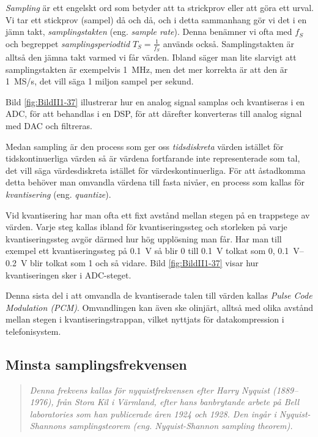\emph{Sampling} är ett engelskt ord som betyder att ta strickprov eller att göra ett urval.
Vi tar ett stickprov (sampel) då och då, och i detta sammanhang gör vi det i en jämn takt,
\emph{samplingstakten} (eng. \emph{sample rate}).
Denna benämner vi ofta med \(f_S\) och begreppet \emph{samplingsperiodtid}
\(T_S=\frac{1}{f_S}\) används också.
Samplingstakten är alltså den jämna takt varmed vi får värden.
Ibland säger man lite slarvigt att samplingstakten är exempelvis 1~MHz, men det
mer korrekta är att den är 1~MS/s, det vill säga 1 miljon sampel per sekund.

Bild \ref{fig:BildII1-37} illustrerar hur en analog signal samplas och
kvantiseras i en ADC, för att behandlas i en DSP, för att därefter konverteras
till analog signal med DAC och filtreras.


Medan sampling är den process som ger oss \emph{tidsdiskreta} värden istället
för tidskontinuerliga värden så är värdena fortfarande inte representerade som
tal, det vill säga värdesdiskreta istället för värdeskontinuerliga.
För att åstadkomma detta behöver man omvandla värdena till fasta nivåer, en
process som kallas för \emph{kvantisering} (eng. \emph{quantize}).

Vid kvantisering har man ofta ett fixt avstånd mellan stegen på en
trappstege av värden. Varje steg kallas ibland för kvantiseringssteg och
storleken på varje kvantiseringssteg avgör därmed hur hög upplösning man får.
Har man till exempel ett kvantiseringssteg på \SI{0,1}{\volt} så blir 0 till
\SI{0,1}{\volt} tolkat som 0, \SIrange{0,1}{0,2}{\volt} blir tolkat som 1 och så
vidare.
Bild \ref{fig:BildII1-37} visar hur kvantiseringen sker i ADC-steget.

Denna sista del i att omvandla de kvantiserade talen till värden kallas
\emph{Pulse Code Modulation (PCM)}.
Omvandlingen kan även ske olinjärt, alltså med olika avstånd mellan stegen i
kvantiseringstrappan, vilket nyttjats för datakompression i telefonisystem.

\subsection{Minsta samplingsfrekvensen}

\begin{quote}
\emph{Denna frekvens kallas för nyquistfrekvensen efter Harry Nyquist (1889--1976),
från Stora Kil i Värmland, efter hans banbrytande arbete på Bell laboratories
som han publicerade åren 1924 och 1928. Den ingår i \emph{Nyquist-Shannons
samplingsteorem} (eng. \emph{Nyquist-Shannon sampling theorem}).}
\end{quote}


